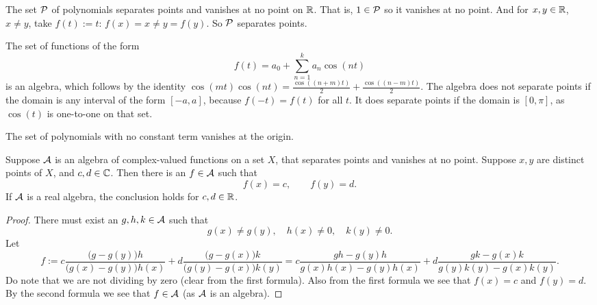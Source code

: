 \begin{example}
The set ${\mathcal{P}}$ of polynomials separates points and vanishes at no point
on ${\mathbb{R}}$.  That is, $1 \in {\mathcal{P}}$ so it vanishes at no point.  And for $x,y \in
{\mathbb{R}}$, $x\not= y$, take $f(t) := t$: $f(x) = x \not= y = f(y)$.
So ${\mathcal{P}}$ separates points.
\end{example}

\begin{example}
The set of functions of the form
\begin{equation*}
f(t) = a_0 + \sum_{n=1}^k a_n \cos(nt)
\end{equation*}
is an algebra,
which follows by the identity $\cos(mt)\cos(nt) = 
\frac{\cos((n+m) t)}{2}+
\frac{\cos((n-m) t)}{2}$.
The algebra
does not separate points if the domain is any interval of the form
$[-a,a]$, because $f(-t) = f(t)$ for all $t$.
It does separate points if the domain is $[0,\pi]$, as $\cos(t)$
is one-to-one on that set.
\end{example}

\begin{example}
The set of polynomials with no constant term vanishes at the origin.
\end{example}

\begin{prop} \label{prop:SWinterpolate}
Suppose ${\mathcal{A}}$ is an algebra of complex-valued functions on a set $X$, that separates points
and vanishes at no point.  Suppose $x,y$ are distinct points of $X$, and
$c,d \in {\mathbb{C}}$.  Then there is an $f \in {\mathcal{A}}$ such that
\begin{equation*}
f(x) = c, \qquad f(y) = d .
\end{equation*}
If ${\mathcal{A}}$ is a real algebra, the conclusion holds for $c,d \in {\mathbb{R}}$.
\end{prop}

\begin{proof}
There must exist an $g,h,k \in {\mathcal{A}}$
such that 
\begin{equation*}
g(x) \not= g(y), \quad h(x) \not= 0, \quad k(y) \not= 0 .
\end{equation*}
Let
\begin{equation*}
f := 
c
\frac{\bigl(g - g(y)\bigr)h}{\bigl(g(x)-g(y)\bigr)h(x) } + 
d
\frac{\bigl(g - g(x)\bigr)k}{\bigl(g(y)-g(x)\bigr)k(y)}
=
c
\frac{gh - g(y)h}{g(x)h(x)-g(y)h(x) } + 
d
\frac{gk - g(x)k}{g(y)k(y)-g(x)k(y)} .
\end{equation*}
Do note that we are not dividing by zero (clear from the first formula).
Also from the first formula we see that $f(x) = c$ and $f(y) = d$.
By the second formula we see that $f \in {\mathcal{A}}$ (as ${\mathcal{A}}$ is an algebra).
\end{proof}


